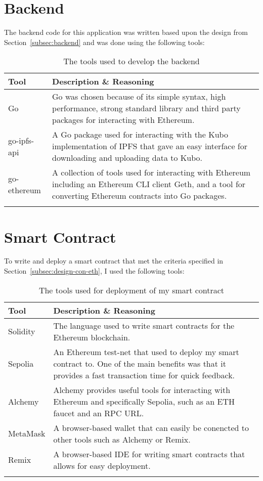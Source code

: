 
\section{Backend}

The backend code for this application was written based upon the design from Section~\ref{subsec:backend} and was done using the following tools:

\begin{longtable}{p{} p{}}
  \toprule
  \textbf{Tool} & \textbf{Description \& Reasoning}
  \\\midrule\midrule
  Go
  & Go was chosen because of its simple syntax, high performance, strong standard library and third party packages for interacting with Ethereum.
  \\
  go-ipfs-api
  & A Go package used for interacting with the Kubo implementation of IPFS that gave an easy interface for downloading and uploading data to Kubo.\\
  go-ethereum
  & A collection of tools used for interacting with Ethereum including an Ethereum CLI client Geth, and a tool for converting Ethereum contracts into Go packages.
  \\\bottomrule\bottomrule
  \caption{The tools used to develop the backend}
\end{longtable}

\section{Smart Contract}

To write and deploy a smart contract that met the criteria specified in Section~\ref{subsec:design-con-eth}, I used the following tools:

\begin{longtable}{p{} p{}}
  \toprule
  \textbf{Tool} & \textbf{Description \& Reasoning}
  \\\midrule\midrule
  Solidity
  & The language used to write smart contracts for the Ethereum blockchain.\\
  Sepolia
  & An Ethereum test-net that used to deploy my smart contract to. One of the main benefits was that it provides a fast transaction time for quick feedback.\\
  Alchemy
  & Alchemy provides useful tools for interacting with Ethereum and specifically Sepolia, such as an ETH faucet and an RPC URL.\\
  MetaMask
  & A browser-based wallet that can easily be conencted to other tools such as Alchemy or Remix.\\
  Remix
  & A browser-based IDE for writing smart contracts that allows for easy deployment.
  \\\bottomrule\bottomrule
  \caption{The tools used for deployment of my smart contract}
\end{longtable}

